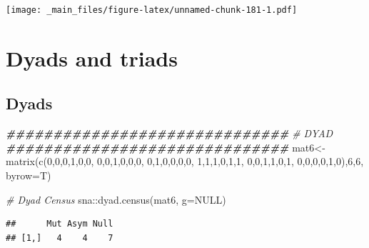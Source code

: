 \documentclass[
  notitlepage,
  onecolumn,
  openany]{book}
\newenvironment{Shaded}{\begin{snugshade}}{\end{snugshade}}
\newcommand{\AttributeTok}[1]{\textcolor[rgb]{0.77,0.63,0.00}{#1}}
\newcommand{\CommentTok}[1]{\textcolor[rgb]{0.56,0.35,0.01}{\textit{#1}}}
\newcommand{\ConstantTok}[1]{\textcolor[rgb]{0.00,0.00,0.00}{#1}}
\newcommand{\DecValTok}[1]{\textcolor[rgb]{0.00,0.00,0.81}{#1}}
\newcommand{\DocumentationTok}[1]{\textcolor[rgb]{0.56,0.35,0.01}{\textbf{\textit{#1}}}}
\newcommand{\FunctionTok}[1]{\textcolor[rgb]{0.00,0.00,0.00}{#1}}
\newcommand{\NormalTok}[1]{#1}
\newcommand{\OtherTok}[1]{\textcolor[rgb]{0.56,0.35,0.01}{#1}}
\newcommand{\SpecialCharTok}[1]{\textcolor[rgb]{0.00,0.00,0.00}{#1}}
\begin{document}
\texttt{[image: \_main\_files/figure-latex/unnamed-chunk-181-1.pdf]}

\hypertarget{dyads-and-triads}{%
\chapter{Dyads and triads}\label{dyads-and-triads}}

\hypertarget{dyads-1}{%
\section{Dyads}\label{dyads-1}}

\begin{Shaded}
\begin{Highlighting}[]
\DocumentationTok{\#\#\#\#\#\#\#\#\#\#\#\#\#\#\#\#\#\#\#\#\#\#\#\#\#\#\#\#\#\#}
\CommentTok{\# DYAD}
\DocumentationTok{\#\#\#\#\#\#\#\#\#\#\#\#\#\#\#\#\#\#\#\#\#\#\#\#\#\#\#\#\#\#}
\NormalTok{mat6}\OtherTok{\textless{}{-}}\FunctionTok{matrix}\NormalTok{(}\FunctionTok{c}\NormalTok{(}\DecValTok{0}\NormalTok{,}\DecValTok{0}\NormalTok{,}\DecValTok{0}\NormalTok{,}\DecValTok{1}\NormalTok{,}\DecValTok{0}\NormalTok{,}\DecValTok{0}\NormalTok{,}
               \DecValTok{0}\NormalTok{,}\DecValTok{0}\NormalTok{,}\DecValTok{1}\NormalTok{,}\DecValTok{0}\NormalTok{,}\DecValTok{0}\NormalTok{,}\DecValTok{0}\NormalTok{,}
               \DecValTok{0}\NormalTok{,}\DecValTok{1}\NormalTok{,}\DecValTok{0}\NormalTok{,}\DecValTok{0}\NormalTok{,}\DecValTok{0}\NormalTok{,}\DecValTok{0}\NormalTok{,}
               \DecValTok{1}\NormalTok{,}\DecValTok{1}\NormalTok{,}\DecValTok{1}\NormalTok{,}\DecValTok{0}\NormalTok{,}\DecValTok{1}\NormalTok{,}\DecValTok{1}\NormalTok{,}
               \DecValTok{0}\NormalTok{,}\DecValTok{0}\NormalTok{,}\DecValTok{1}\NormalTok{,}\DecValTok{1}\NormalTok{,}\DecValTok{0}\NormalTok{,}\DecValTok{1}\NormalTok{,}
               \DecValTok{0}\NormalTok{,}\DecValTok{0}\NormalTok{,}\DecValTok{0}\NormalTok{,}\DecValTok{0}\NormalTok{,}\DecValTok{1}\NormalTok{,}\DecValTok{0}\NormalTok{),}\DecValTok{6}\NormalTok{,}\DecValTok{6}\NormalTok{, }\AttributeTok{byrow=}\NormalTok{T)}

\CommentTok{\# Dyad Census}
\NormalTok{sna}\SpecialCharTok{::}\FunctionTok{dyad.census}\NormalTok{(mat6, }\AttributeTok{g=}\ConstantTok{NULL}\NormalTok{)}
\end{Highlighting}
\end{Shaded}

\begin{verbatim}
##      Mut Asym Null
## [1,]   4    4    7
\end{verbatim}
\end{document}
